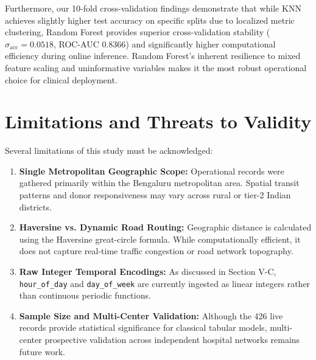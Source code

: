 \documentclass[conference]{IEEEtran}
\begin{document}
Furthermore, our 10-fold cross-validation findings demonstrate that while KNN achieves slightly higher test accuracy on specific splits due to localized metric clustering, Random Forest provides superior cross-validation stability ($\sigma_{\text{acc}} = 0.0518$, ROC-AUC $0.8366$) and significantly higher computational efficiency during online inference. Random Forest's inherent resilience to mixed feature scaling and uninformative variables makes it the most robust operational choice for clinical deployment.

\section{Limitations and Threats to Validity}
Several limitations of this study must be acknowledged:
\begin{enumerate}
    \item \textbf{Single Metropolitan Geographic Scope:} Operational records were gathered primarily within the Bengaluru metropolitan area. Spatial transit patterns and donor responsiveness may vary across rural or tier-2 Indian districts.
    \item \textbf{Haversine vs. Dynamic Road Routing:} Geographic distance is calculated using the Haversine great-circle formula. While computationally efficient, it does not capture real-time traffic congestion or road network topography.
    \item \textbf{Raw Integer Temporal Encodings:} As discussed in Section V-C, \texttt{hour\_of\_day} and \texttt{day\_of\_week} are currently ingested as linear integers rather than continuous periodic functions.
    \item \textbf{Sample Size and Multi-Center Validation:} Although the 426 live records provide statistical significance for classical tabular models, multi-center prospective validation across independent hospital networks remains future work.
\end{enumerate}

\end{document}
